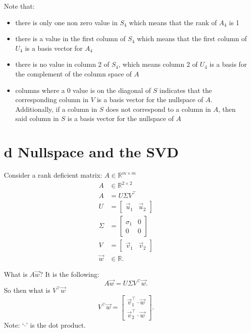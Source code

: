 \documentclass[12pt]{book}
\begin{document}
Note that:
\begin{itemize}
        \item there is only one non zero value in $S_4$ which means that the rank of $A_4$ is 1
        \item there is a value in the first column of $S_4$
                which means that the first column of $U_4$ is a basis vector for $A_4$
        \item there is no value in column 2 of $S_4$, which means column 2 of $U_4$ is a basis for the complement of the column space of $A$
        \item columns where a 0 value is on the diagonal of $S$ indicates that the corresponding column in $V$ is a basis 
                vector for the nullspace of $A$. Additionally, if a column in  $S$ does not correspond to a column in $A$, then said
                column in $S$ is a basis vector for the nullspace of  $A$
                
                
\end{itemize}




\section*{d Nullspace and the SVD}
Consider a rank deficient matrix: $A\in\mathbb{R}^{m\times m}$
\begin{align*}
        A&\in\mathbb{R}^{2\times 2}\\
        A &= U\Sigma V^\top \\
        U &= \begin{bmatrix} \vec u_1 & \vec u_2 \end{bmatrix}  \\
        \Sigma &= \begin{bmatrix} \sigma_1 & 0 \\ 0 & 0 \end{bmatrix}  \\ 
        V &= \begin{bmatrix} \vec v_1 & \vec v_2 \end{bmatrix}\\
        \vec w &\in \mathbb{R}
.\end{align*}

What is $A\vec w$?
It is the following:
 \[
A\vec w = U\Sigma V^\top\vec w
.\] 
So then what is $V^\top\vec w$
 \[
V^\top\vec w = \begin{bmatrix} \vec v_1^\top \cdot \vec w\\ \vec v_2^\top\cdot \vec w \end{bmatrix} 
.\] 
Note: `$\cdot$' is the dot product.
\end{document}
